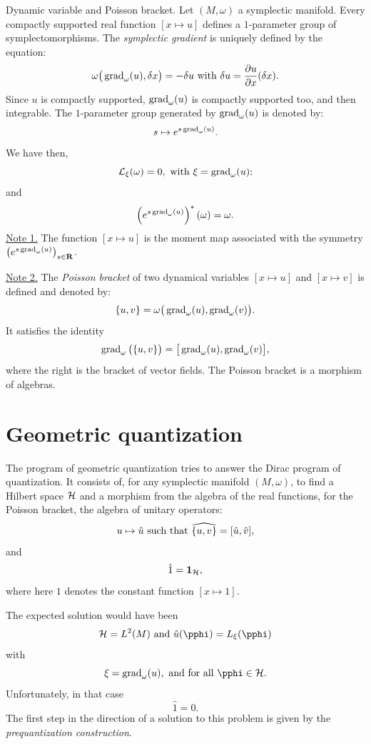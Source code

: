 \begin{Article}{Dynamic variable and Poisson bracket.}{}
  Let $(M,\omega)$ a symplectic manifold.
  Every compactly supported real function $[x \mapsto u]$ defines a $1$-parameter group of symplectomorphisms.
  The \emph{symplectic gradient} is uniquely defined by the equation:
  $$%
    \omega\big(\grad_\omega(u),\delta x\big) = -\delta u
    \SpacedText{with}
    \delta u = {\partial u \over \partial x}(\delta x).
    $$%
  Since $u$ is compactly supported,
  $\operatorname{grad}_\omega(u)$ is compactly supported too,
  and then integrable.
  The $1$-parameter group generated by $\operatorname{grad}_\omega(u)$ is denoted by:
  $$%
    s \mapsto e^{s \grad_\omega(u)}.
    $$%
  We have then,
  $$%
    \cL_\xi(\omega) = 0,
    \SpacedText{with}
    \xi = \grad_\omega(u);
    $$%
  and
  $$%
    \left(e^{s \grad_\omega(u)}\right)^*(\omega) = \omega.
    $$%
  \uline{Note 1.} The function $[x \mapsto u]$ is the moment map associated with the symmetry $\left(e^{s \operatorname{grad}_\omega(u)}\right)_{s \in \mathbf{R}}$.
  
  \uline{Note 2.} The \emph{Poisson bracket} of two dynamical variables $[x \mapsto u]$ and $[x \mapsto v]$ is defined and denoted by:
  $$%
    \{u,v\} = \omega\big(\grad_\omega(u),\grad_\omega(v)\big).
    $$%
  It satisfies the identity
  $$%
    \grad_\omega\big({\{u,v\}}\big) = \big[\grad_\omega(u),\grad_\omega(v)\big],
    $$%
  where the right is the bracket of vector fields.
  The Poisson bracket is a morphism of algebras.
\end{Article}


\section{Geometric quantization}

The program of geometric quantization tries to answer the Dirac program of quantization.
It consists of,
for any symplectic manifold $(M,\omega)$,
to find a Hilbert space $\mathcal{H}$ and a morphism from the algebra of the real functions,
for the Poisson bracket,
the algebra of unitary operators:
$$%
  u \mapsto \hat u
  \SpacedText{such that}
  \widehat{\{u,v\}} = [\hat u, \hat v],
  $$%
and
$$%
  \hat 1 = \Id_{\cH},
  $$%
where here  $1$ denotes the constant function $[x \mapsto 1]$.

The expected solution would have been
$$%
  \cH = L^2(M)
  \SpacedText{and}
  \hat u (\pphi) = L_\xi(\pphi)
  $$%
with
$$%
  \xi = \grad_\omega(u),
  \SpacedText{and for all}
  \pphi \in \cH.
  $$%
Unfortunately,
in that case
$$%
  \hat 1 = 0.
  $$%
The first step in the direction of a solution to this problem is given by the \emph{prequantization construction}.

